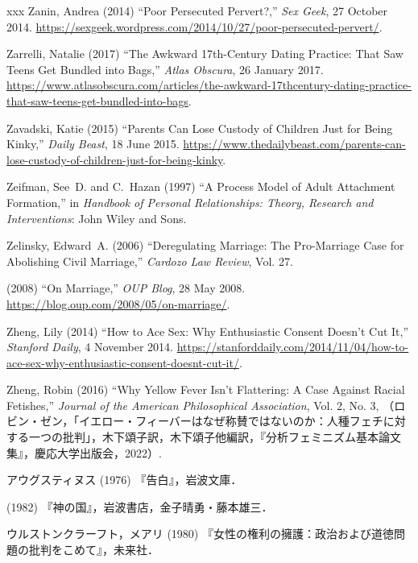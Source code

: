 \documentclass[]{jlreq} \usepackage{mystyle}
\begin{document}
\begin{thebibliography}{xxx}
Zanin, Andrea (2014) ``Poor Persecuted Pervert?,'' \emph{Sex Geek}, 27 October
  2014.
  \url{https://sexgeek.wordpress.com/2014/10/27/poor-persecuted-pervert/}.

Zarrelli, Natalie (2017) ``The Awkward 17th-Century Dating Practice: That Saw
  Teens Get Bundled into Bags,'' \emph{Atlas Obscura}, 26 January 2017.
  \url{https://www.atlasobscura.com/articles/the-awkward-17thcentury-dating-practice-that-saw-teens-get-bundled-into-bags}.

Zavadski, Katie (2015) ``Parents Can Lose Custody of Children Just for Being
  Kinky,'' \emph{Daily Beast}, 18 June 2015.
  \url{https://www.thedailybeast.com/parents-can-lose-custody-of-children-just-for-being-kinky}.

Zeifman, See~D. and C.~Hazan (1997) ``A Process Model of Adult Attachment
  Formation,'' in  \textit{ Handbook of Personal Relationships: Theory,
  Research and Interventions}: John Wiley and Sons.

Zelinsky, Edward~A. (2006) ``Deregulating Marriage: The Pro-Marriage Case for
  Abolishing Civil Marriage,'' \textit{ Cardozo Law Review}, Vol. 27.

 \bysame{}  (2008) ``On Marriage,'' \emph{OUP Blog}, 28 May 2008.
  \url{https://blog.oup.com/2008/05/on-marriage/}.

Zheng, Lily (2014) ``How to Ace Sex: Why Enthusiastic Consent Doesn't Cut It,''
  \emph{Stanford Daily}, 4 November 2014.
  \url{https://stanforddaily.com/2014/11/04/how-to-ace-sex-why-enthusiastic-consent-doesnt-cut-it/}.

Zheng, Robin (2016) ``Why Yellow Fever Isn't Flattering: A Case Against Racial
  Fetishes,'' \textit{ Journal of the American Philosophical Association}, Vol.
  2, No. 3,
  （ロビン・ゼン，「イエロー・フィーバーはなぜ称賛ではないのか：人種フェチに対する一つの批判」，木下頌子訳，木下頌子他編訳，『分析フェミニズム基本論文集』，慶応大学出版会，2022）.

アウグスティヌス (1976) 『告白』，岩波文庫．

 \bysamejp{}  (1982)
  『神の国』，岩波書店，金子晴勇・藤本雄三．

{ウルストンクラーフト，メアリ} (1980)
  『女性の権利の擁護：政治および道徳問題の批判をこめて』，未来社．

\end{thebibliography}
\end{document}
